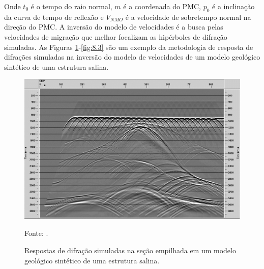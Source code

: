 Onde $t_0$ é o tempo do raio normal, $m$ é a coordenada do PMC, $p_0$ é a inclinação da curva de tempo de reflexão e $V_{NMO}$
é a velocidade de sobretempo normal na direção do PMC. A inversão do modelo de velocidades
é a busca pelas velocidades de migração que melhor focalizam as hipérboles de difração simuladas.
As Figuras \ref{fig:8.1}-\ref{fig:8.3} são um exemplo da metodologia de resposta de difrações simuladas na inversão do
modelo de velocidades de um modelo geológico sintético de uma estrutura salina.

\begin{figure}[htb]
\caption{Respostas de difração simuladas na seção empilhada em um modelo geológico sintético de uma estrutura salina.}
\begin{center}
\includegraphics[scale=0.30]{images/simula_diff.png}
\vspace{-0.3cm}
\end{center}
\begin{center}
 Fonte: \cite{diffractions}.
\end{center}
\label{fig:8.1}
\end{figure}

